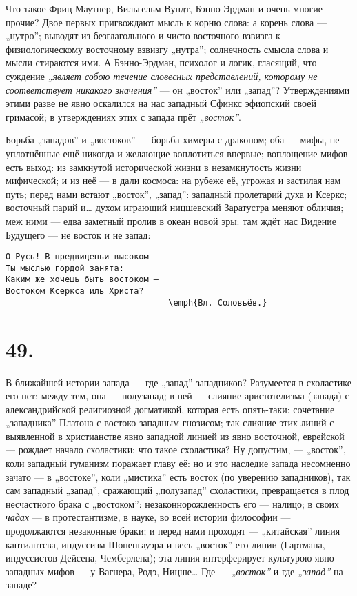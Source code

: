 \documentclass[12pt,a4paper,oneside]{book}
\begin{document}
Что такое Фриц Маутнер, Вильгельм Вундт, Бэнно-Эрдман и очень многие прочие? Двое первых пригвождают мысль к корню слова: а корень слова — „нутро”; выводят из безглагольного и чисто восточного взвизга к физиологическому восточному взвизгу „нутра”; солнечность смысла слова и мысли стираются ими. А Бэнно-Эрдман, психолог и логик, гласящий, что суждение \emph{„являет собою течение словесных представлений, которому не соответствует никакого значения”} — он „восток” или „запад”? Утверждениями этими разве не явно оскалился на нас западный Сфинкс эфиопский своей гримасой; в утверждениях этих с запада прёт \emph{„восток”}.

Борьба „западов” и „востоков” — борьба химеры с драконом; оба — мифы, не уплотнённые ещё никогда и желающие воплотиться впервые; воплощение мифов есть выход: из замкнутой исторической жизни в незамкнутость жизни мифической; и из неё — в дали космоса: на рубеже её, угрожая и застилая нам путь; перед нами встают „восток”, „запад”: западный пролетарий духа и Ксеркс; восточный парий и… духом играющий ницшевский Заратустра меняют обличия; меж ними — едва заметный пролив в океан новой эры: там ждёт нас Видение Будущего — не восток и не запад:

\begin{Verbatim}
О Русь! В предвиденьи высоком
Ты мыслью гордой занята:
Каким же хочешь быть востоком —
Востоком Ксеркса иль Христа?
                                 \emph{Вл. Соловьёв.}
\end{Verbatim}

\section*{49.}

В ближайшей истории запада — где „запад” западников? Разумеется в схоластике его нет: между тем, она — полузапад; в ней — слияние аристотелизма (запада) с александрийской религиозной догматикой, которая есть опять-таки: сочетание „западника” Платона с востоко-западным гнозисом; так слияние этих линий с выявленной в христианстве явно западной линией из явно восточной, еврейской — рождает начало схоластики: что такое схоластика? Ну допустим, — „восток”, коли западный гуманизм поражает главу её: но и это наследие запада несомненно зачато — в „востоке”, коли „мистика” есть восток (по уверению западников), так сам западный „запад”, сражающий „полузапад” схоластики, превращается в плод несчастного брака с „востоком”: незаконнорожденность его — налицо; в своих \emph{чадах} — в протестантизме, в науке, во всей истории философии — продолжаются незаконные браки; и перед нами проходят — „китайская” линия кантиантсва, индуссизм Шопенгауэра и весь „восток” его линии (Гартмана, индуссистов Дейсена, Чемберлена); эта линия интерферирует культурою явно западных мифов — у Вагнера, Родэ, Ницше… Где — \emph{„восток”} и где \emph{„запад”} на западе?
\end{document}
